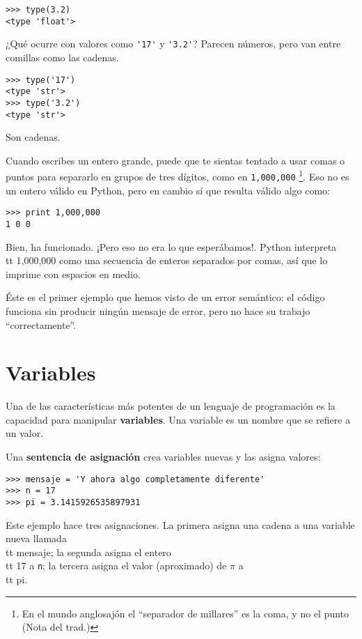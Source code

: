 
\beforeverb
\begin{verbatim}
>>> type(3.2)
<type 'float'>
\end{verbatim}
\afterverb
%
¿Qué ocurre con valores como \verb"'17'" y \verb"'3.2'"?
Parecen números, pero van entre comillas como
las cadenas.


\beforeverb
\begin{verbatim}
>>> type('17')
<type 'str'>
>>> type('3.2')
<type 'str'>
\end{verbatim}
\afterverb
%
Son cadenas.

Cuando escribes un entero grande, puede que te sientas tentado a usar comas
o puntos para separarlo en grupos de tres dígitos, como en {\tt 1,000,000}
\footnote{En el mundo anglosajón el ``separador de millares'' es la coma, y no el punto (Nota del trad.)}.
Eso no es un entero válido en Python, pero en cambio sí que resulta válido algo como:

\beforeverb
\begin{verbatim}
>>> print 1,000,000
1 0 0
\end{verbatim}
\afterverb
%
Bien, ha funcionado. ¡Pero eso no era lo que esperábamos!. Python interpreta
{\\tt 1,000,000} como una secuencia de enteros separados por comas, así que lo
imprime con espacios en medio.


Éste es el primer ejemplo que hemos visto de un error semántico: el código
funciona sin producir ningún mensaje de error, pero no hace su trabajo
``correctamente''.

\section{Variables}

Una de las características más potentes de un lenguaje de programación es
la capacidad para manipular {\bf variables}. Una variable es un nombre
que se refiere a un valor.

Una {\bf sentencia de asignación} crea variables nuevas y las
asigna valores:

\beforeverb
\begin{verbatim}
>>> mensaje = 'Y ahora algo completamente diferente'
>>> n = 17
>>> pi = 3.1415926535897931
\end{verbatim}
\afterverb
%
Este ejemplo hace tres asignaciones. La primera asigna una cadena
a una variable nueva llamada {\\tt mensaje};
la segunda asigna el entero {\\tt 17} a {\tt n}; la tercera
asigna el valor (aproximado) de $\pi$ a {\\tt pi}.

